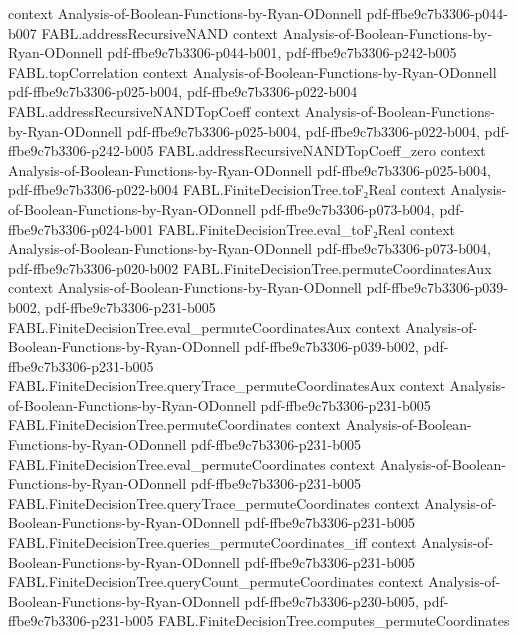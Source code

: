 \begin{theorem}
  {context}
  {Analysis-of-Boolean-Functions-by-Ryan-ODonnell}
  {pdf-ffbe9c7b3306-p044-b007}
\proofstep
  {FABL.addressRecursiveNAND}
  {context}
  {Analysis-of-Boolean-Functions-by-Ryan-ODonnell}
  {pdf-ffbe9c7b3306-p044-b001,
    pdf-ffbe9c7b3306-p242-b005}
\proofstep
  {FABL.topCorrelation}
  {context}
  {Analysis-of-Boolean-Functions-by-Ryan-ODonnell}
  {pdf-ffbe9c7b3306-p025-b004,
    pdf-ffbe9c7b3306-p022-b004}
\proofstep
  {FABL.addressRecursiveNANDTopCoeff}
  {context}
  {Analysis-of-Boolean-Functions-by-Ryan-ODonnell}
  {pdf-ffbe9c7b3306-p025-b004,
    pdf-ffbe9c7b3306-p022-b004,
    pdf-ffbe9c7b3306-p242-b005}
\proofstep
  {FABL.addressRecursiveNANDTopCoeff_zero}
  {context}
  {Analysis-of-Boolean-Functions-by-Ryan-ODonnell}
  {pdf-ffbe9c7b3306-p025-b004,
    pdf-ffbe9c7b3306-p022-b004}
\proofstep
  {FABL.FiniteDecisionTree.toF₂Real}
  {context}
  {Analysis-of-Boolean-Functions-by-Ryan-ODonnell}
  {pdf-ffbe9c7b3306-p073-b004,
    pdf-ffbe9c7b3306-p024-b001}
\proofstep
  {FABL.FiniteDecisionTree.eval_toF₂Real}
  {context}
  {Analysis-of-Boolean-Functions-by-Ryan-ODonnell}
  {pdf-ffbe9c7b3306-p073-b004,
    pdf-ffbe9c7b3306-p020-b002}
\proofstep
  {FABL.FiniteDecisionTree.permuteCoordinatesAux}
  {context}
  {Analysis-of-Boolean-Functions-by-Ryan-ODonnell}
  {pdf-ffbe9c7b3306-p039-b002,
    pdf-ffbe9c7b3306-p231-b005}
\proofstep
  {FABL.FiniteDecisionTree.eval_permuteCoordinatesAux}
  {context}
  {Analysis-of-Boolean-Functions-by-Ryan-ODonnell}
  {pdf-ffbe9c7b3306-p039-b002,
    pdf-ffbe9c7b3306-p231-b005}
\proofstep
  {FABL.FiniteDecisionTree.queryTrace_permuteCoordinatesAux}
  {context}
  {Analysis-of-Boolean-Functions-by-Ryan-ODonnell}
  {pdf-ffbe9c7b3306-p231-b005}
\proofstep
  {FABL.FiniteDecisionTree.permuteCoordinates}
  {context}
  {Analysis-of-Boolean-Functions-by-Ryan-ODonnell}
  {pdf-ffbe9c7b3306-p231-b005}
\proofstep
  {FABL.FiniteDecisionTree.eval_permuteCoordinates}
  {context}
  {Analysis-of-Boolean-Functions-by-Ryan-ODonnell}
  {pdf-ffbe9c7b3306-p231-b005}
\proofstep
  {FABL.FiniteDecisionTree.queryTrace_permuteCoordinates}
  {context}
  {Analysis-of-Boolean-Functions-by-Ryan-ODonnell}
  {pdf-ffbe9c7b3306-p231-b005}
\proofstep
  {FABL.FiniteDecisionTree.queries_permuteCoordinates_iff}
  {context}
  {Analysis-of-Boolean-Functions-by-Ryan-ODonnell}
  {pdf-ffbe9c7b3306-p231-b005}
\proofstep
  {FABL.FiniteDecisionTree.queryCount_permuteCoordinates}
  {context}
  {Analysis-of-Boolean-Functions-by-Ryan-ODonnell}
  {pdf-ffbe9c7b3306-p230-b005,
    pdf-ffbe9c7b3306-p231-b005}
\proofstep
  {FABL.FiniteDecisionTree.computes_permuteCoordinates}

\end{theorem}
